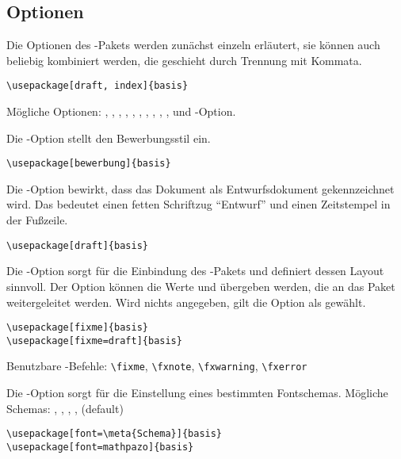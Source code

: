 \subsection{Optionen}
\label{sec:Optionen}

Die Optionen des -Pakets werden zunächst einzeln erläutert, sie können
auch beliebig kombiniert werden, die geschieht durch Trennung mit Kommata.

\verb#\usepackage[draft, index]{basis}#

Mögliche Optionen: , , , , , , , , , ,  und -Option.


Die -Option stellt den Bewerbungsstil ein.

\verb#\usepackage[bewerbung]{basis}#


Die -Option bewirkt, dass das Dokument als Entwurfsdokument gekennzeichnet wird.
Das bedeutet einen fetten Schriftzug "`Entwurf"' und einen Zeitstempel in der Fußzeile.

\verb#\usepackage[draft]{basis}#


Die -Option sorgt für die Einbindung des -Pakets und definiert dessen Layout sinnvoll.
Der Option können die Werte  und  übergeben werden, die an das Paket weitergeleitet werden.
Wird nichts angegeben, gilt die Option  als gewählt.

\verb#\usepackage[fixme]{basis}#\\
\verb#\usepackage[fixme=draft]{basis}#

Benutzbare -Befehle: \verb#\fixme#, \verb#\fxnote#, \verb#\fxwarning#, \verb#\fxerror#


Die -Option sorgt für die Einstellung eines bestimmten Fontschemas.
Mögliche Schemas: , , , ,  (default)

\verb#\usepackage[font=\meta{Schema}]{basis}#\\
\verb#\usepackage[font=mathpazo]{basis}#


